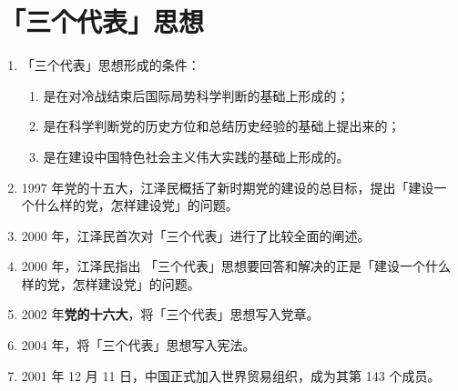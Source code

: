 \documentclass[UTF8]{ctexart}
\newcommand\Emph[2]{\colorbox{c#1-light}{\textcolor{c#1-emph}{\textbf{#2}}}}
\begin{document}
\section{「三个代表」思想}\label{sec:7}
\begin{enumerate}[start=1]
  \item 「三个代表」思想形成的条件：
  \begin{enumerate}[label={\roman{enumii})}, start=1]
    \item 是在对冷战结束后国际局势科学判断的基础上形成的；
    \item 是在科学判断党的历史方位和总结历史经验的基础上提出来的；
    \item 是在建设中国特色社会主义伟大实践的基础上形成的。
  \end{enumerate}
  \item 1997 年党的十五大，江泽民概括了新时期党的建设的总目标，提出「建设一个什么样的党，怎样建设党」的问题。
  \item 2000 年，江泽民首次对「三个代表」进行了比较全面的阐述。
  \item 2000 年，江泽民指出 「三个代表」思想要回答和解决的正是「建设一个什么样的党，怎样建设党」的问题。
  \item 2002 年\Emph{7}{党的十六大}，将「三个代表」思想写入党章。
  \item 2004 年，将「三个代表」思想写入宪法。
  \item 2001 年 12 月 11 日，中国正式加入世界贸易组织，成为其第 143 个成员。
\end{enumerate}
\end{document}
